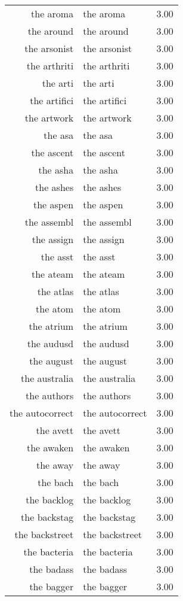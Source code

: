 \begin{table}[ht]
\begin{tabular}{rlr}
  the aroma & the aroma & 3.00 \\ 
  the around & the around & 3.00 \\ 
  the arsonist & the arsonist & 3.00 \\ 
  the arthriti & the arthriti & 3.00 \\ 
  the arti & the arti & 3.00 \\ 
  the artifici & the artifici & 3.00 \\ 
  the artwork & the artwork & 3.00 \\ 
  the asa & the asa & 3.00 \\ 
  the ascent & the ascent & 3.00 \\ 
  the asha & the asha & 3.00 \\ 
  the ashes & the ashes & 3.00 \\ 
  the aspen & the aspen & 3.00 \\ 
  the assembl & the assembl & 3.00 \\ 
  the assign & the assign & 3.00 \\ 
  the asst & the asst & 3.00 \\ 
  the ateam & the ateam & 3.00 \\ 
  the atlas & the atlas & 3.00 \\ 
  the atom & the atom & 3.00 \\ 
  the atrium & the atrium & 3.00 \\ 
  the audusd & the audusd & 3.00 \\ 
  the august & the august & 3.00 \\ 
  the australia & the australia & 3.00 \\ 
  the authors & the authors & 3.00 \\ 
  the autocorrect & the autocorrect & 3.00 \\ 
  the avett & the avett & 3.00 \\ 
  the awaken & the awaken & 3.00 \\ 
  the away & the away & 3.00 \\ 
  the bach & the bach & 3.00 \\ 
  the backlog & the backlog & 3.00 \\ 
  the backstag & the backstag & 3.00 \\ 
  the backstreet & the backstreet & 3.00 \\ 
  the bacteria & the bacteria & 3.00 \\ 
  the badass & the badass & 3.00 \\ 
  the bagger & the bagger & 3.00 \\ 

\end{tabular}
\end{table}
